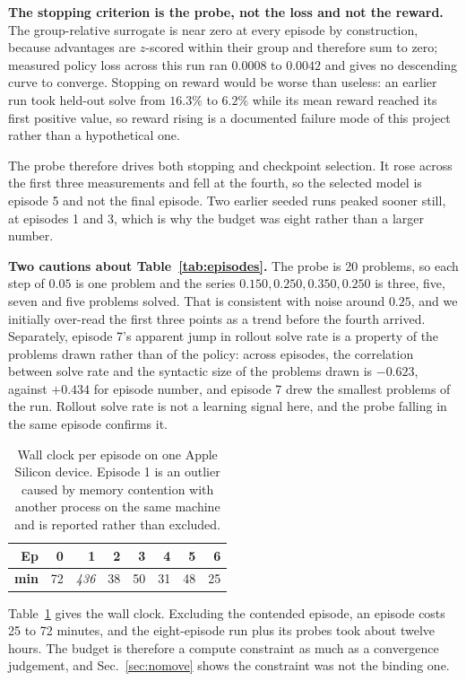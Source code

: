 \documentclass[conference]{IEEEtran}
\begin{document}
\textbf{The stopping criterion is the probe, not the loss and not the reward.}
The group-relative surrogate is near zero at every episode by construction,
because advantages are $z$-scored within their group and therefore sum to zero;
measured policy loss across this run ran $0.0008$ to $0.0042$ and gives no
descending curve to converge. Stopping on reward would be worse than useless:
an earlier run took held-out solve from $16.3\%$ to $6.2\%$ while its mean
reward reached its first positive value, so reward rising is a documented
failure mode of this project rather than a hypothetical one.

The probe therefore drives both stopping and checkpoint selection. It rose
across the first three measurements and fell at the fourth, so the selected
model is episode 5 and not the final episode. Two earlier seeded runs peaked
sooner still, at episodes 1 and 3, which is why the budget was eight rather
than a larger number.

\textbf{Two cautions about Table~\ref{tab:episodes}.} The probe is 20 problems,
so each step of $0.05$ is one problem and the series $0.150, 0.250, 0.350,
0.250$ is three, five, seven and five problems solved. That is consistent with
noise around $0.25$, and we initially over-read the first three points as a
trend before the fourth arrived. Separately, episode 7's apparent jump in
rollout solve rate is a property of the problems drawn rather than of the
policy: across episodes, the correlation between solve rate and the syntactic
size of the problems drawn is $-0.623$, against $+0.434$ for episode number,
and episode 7 drew the smallest problems of the run. Rollout solve rate is not
a learning signal here, and the probe falling in the same episode confirms it.

\begin{table}[t]
\caption{Wall clock per episode on one Apple Silicon device. Episode 1 is an
outlier caused by memory contention with another process on the same machine
and is reported rather than excluded.}
\label{tab:walltime}
\centering
\small
\begin{tabular}{rrrrrrrr}
\toprule
\textbf{Ep} & 0 & 1 & 2 & 3 & 4 & 5 & 6 \\
\midrule
\textbf{min} & 72 & \textit{436} & 38 & 50 & 31 & 48 & 25 \\
\bottomrule
\end{tabular}
\end{table}

Table~\ref{tab:walltime} gives the wall clock. Excluding the contended episode, an episode costs 25 to 72 minutes, and the
eight-episode run plus its probes took about twelve hours. The budget is
therefore a compute constraint as much as a convergence judgement, and
Sec.~\ref{sec:nomove} shows the constraint was not the binding one.
\end{document}
